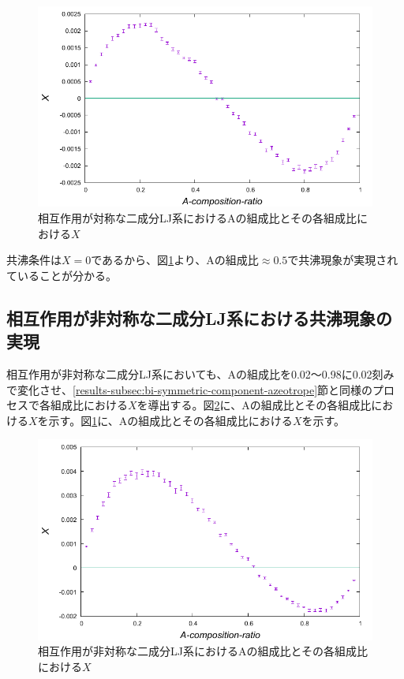 \documentclass[titlepage]{jsreport}
\begin{document}
\begin{figure}[htbp]
    \begin{center}
        \includegraphics[width=14cm]{fig/bi-symmetric/L100T1.0.pdf}
    \end{center}
    \caption{相互作用が対称な二成分LJ系におけるAの組成比とその各組成比における$X$}
    \label{fig:bi-symmetric}
\end{figure}

共沸条件は$X=0$であるから、図\ref{fig:bi-symmetric}より、Aの組成比$\approx0.5$で共沸現象が実現されていることが分かる。

\newpage
\subsection{相互作用が非対称な二成分LJ系における共沸現象の実現} \label{results-subsec:bi-asymmetric-component-azeotrope}
相互作用が非対称な二成分LJ系においても、Aの組成比を0.02〜0.98に0.02刻みで変化させ、\ref{results-subsec:bi-symmetric-component-azeotrope}節と同様のプロセスで各組成比における$X$を導出する。図\ref{fig:bi-asymmetric}に、Aの組成比とその各組成比における$X$を示す。図\ref{fig:bi-symmetric}に、Aの組成比とその各組成比における$X$を示す。

\begin{figure}[htbp]
    \begin{center}
        \includegraphics[width=14cm]{fig/bi-asymmetric/L100T1.0E1.05.pdf}
    \end{center}
    \caption{相互作用が非対称な二成分LJ系におけるAの組成比とその各組成比における$X$}
    \label{fig:bi-asymmetric}
\end{figure}
\end{document}
